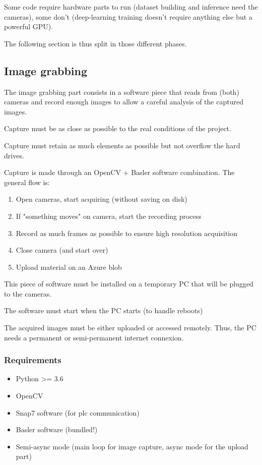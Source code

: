 Some code require hardware parts to run (dataset building and inference need the cameras), some don't
(deep-learning training doesn't require anything else but a powerful GPU).

The following section is thus split in those different phases.

\subsection{Image grabbing}

The image grabbing part consists in a software piece that reads from (both) cameras and record enough images to
allow a careful analysis of the captured images.

Capture must be as close as possible to the real conditions of the project.

Capture must retain as much elements as possible but not overflow the hard drives.

Capture is made through an OpenCV + Basler software combination. The general flow is:

\begin{enumerate}
    \item Open cameras, start acquiring (without saving on disk)
    \item If "something moves" on camera, start the recording process
    \item Record as much frames as possible to ensure high resolution acquisition
    \item Close camera (and start over)
    \item Upload material on an Azure blob
\end{enumerate}

This piece of software must be installed on a temporary PC that will be plugged to the cameras.

The software must start when the PC starts (to handle reboots)

The acquired images must be either uploaded or accessed remotely. Thus, the PC needs a permanent or semi-permanent internet connexion.

\subsubsection{Requirements}

\begin{itemize}
    \item Python >= 3.6
    \item OpenCV
    \item Snap7 software (for \gls{plc} communication)
    \item Basler software (bundled!)
    \item Semi-async mode (main loop for image capture, async mode for the upload part)
\end{itemize}

